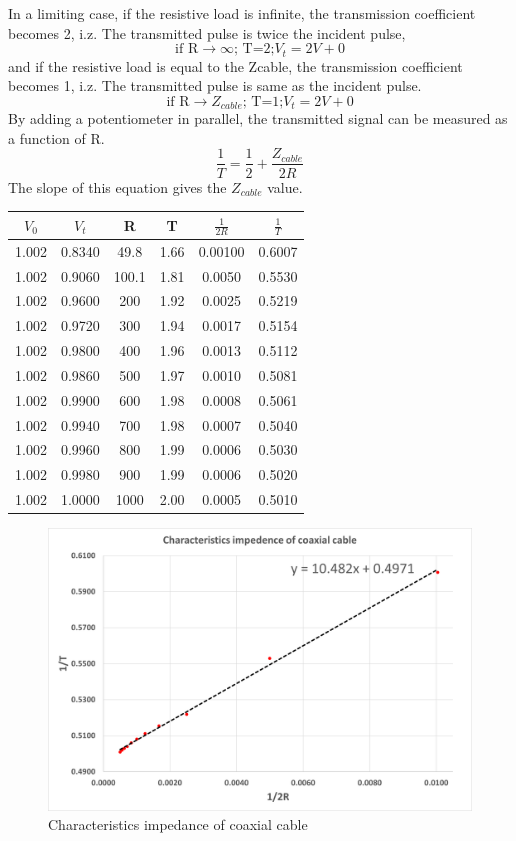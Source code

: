 \documentclass[12pt,a4paper,bold]{thesis}
\theoremstyle{thm}
\theoremstyle{definition}
\begin{document}
In a limiting case, if the resistive load is infinite, the transmission coefficient becomes 2, i.z. The transmitted pulse is twice the incident pulse,
\[\text{if R}\rightarrow\infty\text{; T=2;}V_t=2V+0 \]
 and if the resistive load is equal to the Zcable,  the transmission coefficient becomes 1, i.z. The transmitted pulse is same as the incident pulse.
\[\text{if R}\rightarrow Z_{cable}\text{; T=1;}V_t=2V+0 \]
By adding a potentiometer in parallel, the transmitted signal can be measured as a function of R.
\[\frac{1}{T}=\frac{1}{2} + \frac{Z_{cable}}{2R}\]
The slope of this equation gives the $Z_{cable}$ value.

\begin{center}
\begin{tabular}{||c c c c c c||} 
 \hline
 $V_0$ & $V_t$ & R & T & $\frac{1}{2R}$ & $\frac{1}{T}$\\ [0.5ex] 
 \hline\hline
 1.002 & 0.8340 & 49.8 & 1.66 & 0.00100 & 0.6007\\
 1.002 & 0.9060 & 100.1 & 1.81 & 0.0050  & 0.5530\\
 1.002 & 0.9600 & 200 & 1.92 & 0.0025  & 0.5219\\
 1.002 & 0.9720 & 300 & 1.94 & 0.0017 & 0.5154\\
 1.002 & 0.9800 & 400 & 1.96 & 0.0013 & 0.5112\\
 1.002 & 0.9860 & 500 & 1.97 & 0.0010 & 0.5081\\
 1.002 & 0.9900 & 600 & 1.98 & 0.0008 & 0.5061\\
 1.002 & 0.9940 & 700 & 1.98 & 0.0007 & 0.5040\\
 1.002 & 0.9960 & 800 & 1.99 & 0.0006 & 0.5030\\ 
 1.002 & 0.9980 & 900 & 1.99 & 0.0006 & 0.5020\\
 1.002 & 1.0000 & 1000 & 2.00 & 0.0005 & 0.5010\\ [1ex] 
 \hline
\end{tabular}
\end{center}
\begin{figure}[H]
	\centering
   \includegraphics[scale=0.56]{Images/44.png} 
   \caption{Characteristics impedance of coaxial cable}
\end{figure}
\end{document}
